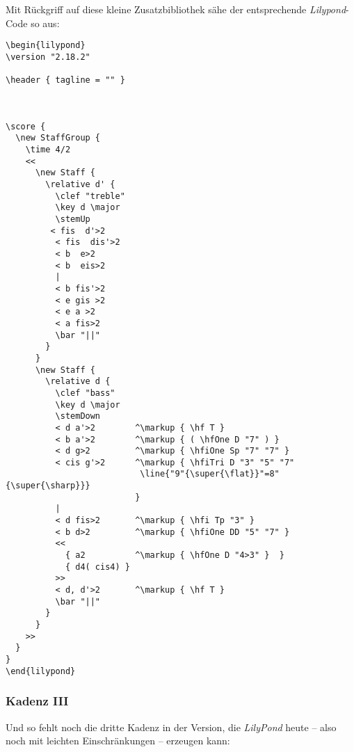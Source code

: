 Mit Rückgriff auf diese kleine Zusatzbibliothek sähe der entsprechende
\textit{Lilypond}-Code so aus:
\begin{verbatim}
\begin{lilypond}
\version "2.18.2"

\header { tagline = "" }


  
\score {
  \new StaffGroup {
    \time 4/2
    <<
      \new Staff {
        \relative d' {
          \clef "treble"
          \key d \major  
          \stemUp
         < fis  d'>2    
          < fis  dis'>2   
          < b  e>2        
          < b  eis>2        
          | 
          < b fis'>2  
          < e gis >2  
          < e a >2    
          < a fis>2      
          \bar "||"
        }   
      }
      \new Staff {
        \relative d { 
          \clef "bass"
          \key d \major  
          \stemDown
          < d a'>2        ^\markup { \hf T }                      
          < b a'>2        ^\markup { ( \hfOne D "7" ) }           
          < d g>2         ^\markup { \hfiOne Sp "7" "7" }         
          < cis g'>2      ^\markup { \hfiTri D "3" "5" "7" 
                           \line{"9"{\super{\flat}}"=8"{\super{\sharp}}}
                          }                               
          |
          < d fis>2       ^\markup { \hfi Tp "3" }                
          < b d>2         ^\markup { \hfiOne DD "5" "7" }         
          <<
            { a2          ^\markup { \hfOne D "4>3" }  }
            { d4( cis4) }
          >> 
          < d, d'>2       ^\markup { \hf T }
          \bar "||"
        }   
      }
    >>
  }
}
\end{lilypond}
\end{verbatim}


\subsubsection{Kadenz III}

Und so fehlt noch die dritte Kadenz in der Version, die \textit{LilyPond} heute -- also
noch mit leichten Einschränkungen -- erzeugen kann:

